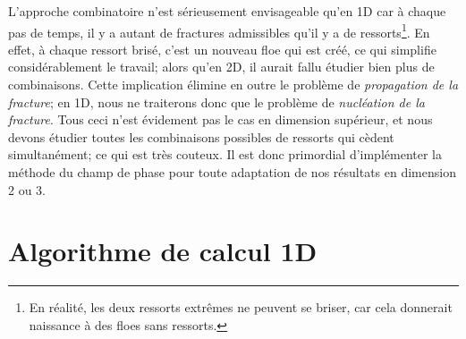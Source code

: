 L'approche combinatoire n'est sérieusement envisageable qu'en 1D car à chaque pas de temps, il y a autant de fractures admissibles qu'il y a de ressorts\footnote{En réalité, les deux ressorts extrêmes ne peuvent se briser, car cela donnerait naissance à des floes sans ressorts.}. En effet, à chaque ressort brisé, c'est un nouveau floe qui est créé, ce qui simplifie considérablement le travail; alors qu'en 2D, il aurait fallu étudier bien plus de combinaisons. Cette implication élimine en outre le problème de \emph{propagation de la fracture}; en 1D, nous ne traiterons donc que le problème de \emph{nucléation de la fracture}. Tous ceci n'est évidement pas le cas en dimension supérieur, et nous devons étudier toutes les combinaisons possibles de ressorts qui cèdent simultanément; ce qui est très couteux. Il est donc primordial d'implémenter la méthode du champ de phase pour toute adaptation de nos résultats en dimension 2 ou 3.







\section{Algorithme de calcul 1D}


